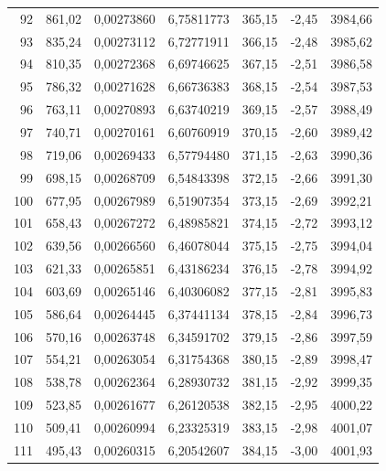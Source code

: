 \documentclass[12pt,a4paper,final,twoside,fleqn]{article}
\begin{document}
\begin{ThreePartTable}
\begin{longtable}{rrrrrrr}
92           & 861,02    & 0,00273860    & 6,75811773  & 365,15     & -2,45      & 3984,66 \\
93           & 835,24    & 0,00273112    & 6,72771911  & 366,15     & -2,48      & 3985,62 \\
94           & 810,35    & 0,00272368    & 6,69746625  & 367,15     & -2,51      & 3986,58 \\
95           & 786,32    & 0,00271628    & 6,66736383  & 368,15     & -2,54      & 3987,53 \\
96           & 763,11    & 0,00270893    & 6,63740219  & 369,15     & -2,57      & 3988,49 \\
97           & 740,71    & 0,00270161    & 6,60760919  & 370,15     & -2,60      & 3989,42 \\
98           & 719,06    & 0,00269433    & 6,57794480  & 371,15     & -2,63      & 3990,36 \\
99           & 698,15    & 0,00268709    & 6,54843398  & 372,15     & -2,66      & 3991,30 \\
100          & 677,95    & 0,00267989    & 6,51907354  & 373,15     & -2,69      & 3992,21 \\
101          & 658,43    & 0,00267272    & 6,48985821  & 374,15     & -2,72      & 3993,12 \\
102          & 639,56    & 0,00266560    & 6,46078044  & 375,15     & -2,75      & 3994,04 \\
103          & 621,33    & 0,00265851    & 6,43186234  & 376,15     & -2,78      & 3994,92 \\
104          & 603,69    & 0,00265146    & 6,40306082  & 377,15     & -2,81      & 3995,83 \\
105          & 586,64    & 0,00264445    & 6,37441134  & 378,15     & -2,84      & 3996,73 \\
106          & 570,16    & 0,00263748    & 6,34591702  & 379,15     & -2,86      & 3997,59 \\
107          & 554,21    & 0,00263054    & 6,31754368  & 380,15     & -2,89      & 3998,47 \\
108          & 538,78    & 0,00262364    & 6,28930732  & 381,15     & -2,92      & 3999,35 \\
109          & 523,85    & 0,00261677    & 6,26120538  & 382,15     & -2,95      & 4000,22 \\
110          & 509,41    & 0,00260994    & 6,23325319  & 383,15     & -2,98      & 4001,07 \\
111          & 495,43    & 0,00260315    & 6,20542607  & 384,15     & -3,00      & 4001,93 \\

\end{longtable}
\end{ThreePartTable}
\end{document}
